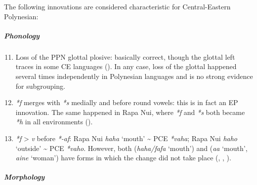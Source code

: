 The following innovations are considered characteristic for Central-Eastern Polynesian:

\subparagraph{Phonology}

\begin{enumerate}
\setcounter{enumi}{10}
\item 
Loss of the PPN glottal plosive: basically correct, though the glottal left traces in some CE languages (\citealt[70–71]{Marck2000}). In any case, loss of the glottal happened several times independently in Polynesian languages and is no strong evidence for subgrouping.   

\item 
\textit{*f} merges with \textit{*s} medially and before round vowels: this is in fact an EP innovation. The same happened in Rapa Nui, where \textit{*f} and \textit{*s} both became \textit{*h} in all environments ().   

\item 
\textit{*f} {\textgreater} \textit{v} before \textit{*-af}: Rapa Nui \textit{haha} ‘mouth’ {\textasciitilde} PCE \textit{*vaha}; Rapa Nui \textit{haho} ‘outside’ {\textasciitilde} PCE \textit{*vaho}. However, both  (\textit{haha/fafa} ‘mouth’) and  (\textit{{\ꞌ}a{\ꞌ}a} ‘mouth’, \textit{{\ꞌ}a{\ꞌ}ine} ‘woman’) have forms in which the change did not take place (\citealt[509]{Elbert1982}, \citealt[351–352]{Wilson2012}, \citealt{Fischer2001Doublets}).   

\end{enumerate}

\subparagraph{Morphology}

